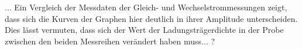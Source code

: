 



... Ein Vergleich der Messdaten der Gleich- und Wechselstrommessungen zeigt, dass sich die Kurven der Graphen hier deutlich in ihrer Amplitude unterscheiden. Dies lässt vermuten, dass sich der Wert der Ladungsträgerdichte in der Probe zwischen den beiden Messreihen verändert haben muss... ? 


